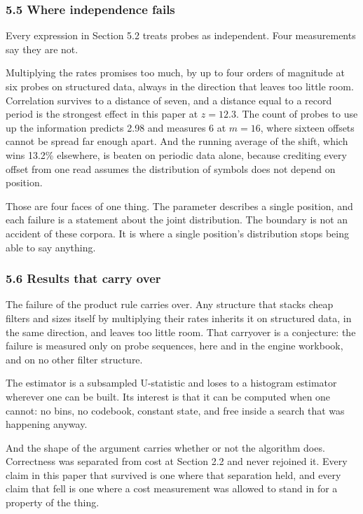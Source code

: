 \subsubsection{5.5 Where independence fails}

Every expression in Section 5.2 treats probes as independent. Four measurements say they are not.

Multiplying the rates promises too much, by up to four orders of magnitude at six probes on structured data, always in the direction that leaves too little room. Correlation survives to a distance of seven, and a distance equal to a record period is the strongest effect in this paper at \(z = 12.3\). The count of probes to use up the information predicts 2.98 and measures 6 at \(m = 16\), where sixteen offsets cannot be spread far enough apart. And the running average of the shift, which wins 13.2\% elsewhere, is beaten on periodic data alone, because crediting every offset from one read assumes the distribution of symbols does not depend on position.

Those are four faces of one thing. The parameter describes a single position, and each failure is a statement about the joint distribution. The boundary is not an accident of these corpora. It is where a single position's distribution stops being able to say anything.

\subsubsection{5.6 Results that carry over}

The failure of the product rule carries over. Any structure that stacks cheap filters and sizes itself by multiplying their rates inherits it on structured data, in the same direction, and leaves too little room. That carryover is a conjecture: the failure is measured only on probe sequences, here and in the engine workbook, and on no other filter structure.

The estimator is a subsampled U-statistic and loses to a histogram estimator wherever one can be built. Its interest is that it can be computed when one cannot: no bins, no codebook, constant state, and free inside a search that was happening anyway.

And the shape of the argument carries whether or not the algorithm does. Correctness was separated from cost at Section 2.2 and never rejoined it. Every claim in this paper that survived is one where that separation held, and every claim that fell is one where a cost measurement was allowed to stand in for a property of the thing.

